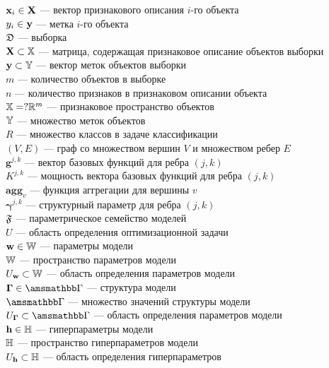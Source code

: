 \noindent$\mathbf{x}_i \in \mathbf{X}$ --- вектор признакового описания $i$-го объекта\\
$y_i \in \mathbf{y}$ --- метка $i$-го объекта\\
$\mathfrak{D}$ --- выборка\\
$\mathbf{X} \subset \mathbb{X}$ --- матрица, содержащая признаковое описание объектов выборки\\
$\mathbf{y} \subset \mathbb{Y}$ --- вектор меток объектов выборки\\
$m$ --- количество объектов в выборке\\
$n$ --- количество признаков в признаковом описании объекта\\
$\mathbb{X} =? \mathbb{R}^m$ --- признаковое пространство объектов\\
$\mathbb{Y}$ --- множество меток объектов\\
$R$ --- множество классов в задаче классификации\\
$(V,E)$ --- граф со множеством вершин $V$ и множеством ребер $E$\\
$\mathbf{g}^{j,k}$ --- вектор базовых функций для ребра $(j,k)$\\
$K^{j,k}$ --- мощность вектора базовых функций для ребра $(j,k)$\\
$\textbf{agg}_v$ --- функция аггрегации для вершины $v$ \\
$\boldsymbol{\gamma}^{j,k}$ --- структурный параметр для ребра $(j,k)$\\
$\mathfrak{F}$ --- параметрическое семейство моделей\\
$U$ --- область определения оптимизационной задачи\\
$\mathbf{w} \in \mathbb{W}$ --- параметры модели\\
$\mathbb{W}$ --- пространство параметров модели\\
$U_\mathbf{w} \subset \mathbb{W}$ --- область определения параметров модели\\
$\G \in \Gb$ --- структура модели\\
$\Gb$ --- множество значений структуры модели\\
$\UG \subset \Gb$ --- область определения параметров модели\\
$\mathbf{h} \in \mathbb{H}$ --- гиперпараметры модели\\
$\mathbb{H}$ --- пространство гиперпараметров модели\\
$U_{\mathbf{h}} \subset \mathbb{H}$ --- область определения гиперпараметров\\
